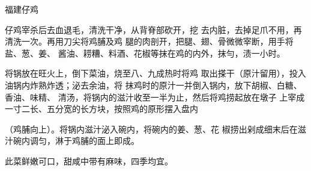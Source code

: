 \begin{recipe}{福建仔鸡}

\ingredients


\cooking

\step 仔鸡宰杀后去血退毛，清洗干净，从背脊部砍开，挖 去内脏，去掉足爪不用，再清洗一次。再用刀尖将鸡脯及鸡 腿的肉剖开，把腿、翅、骨微微宰断，用手将盐、葱、姜、 酱油、耢糟、料酒、花椒等抹在鸡的内外，抹勻，渍一小时。

\step 将锅放在旺火上，倒下菜油，烧至八、九成热时将鸡 取出搽干（原汁留用），投入油锅内炸熟炸透；泌去余油，将 抹鸡时的原汁一并倒入锅内，放下胡椒、白糖、香油、味精、 清汤，将锅内的滋汁收至一半为止，然后将鸡捞起放在墩子 上宰成一寸二长、五分宽的长方块，按照鸡的原形摆入盘内

（鸡脯向上）。将锅内滋汁泌入碗内，将碗内的姜、葱、花 椒捞出剁成细末后在滋汁碗内调匀，淋于鸡脯的面上即成。

\notes

此菜鲜嫩可口，甜咸中带有麻味，四季均宜。

\end{recipe}

